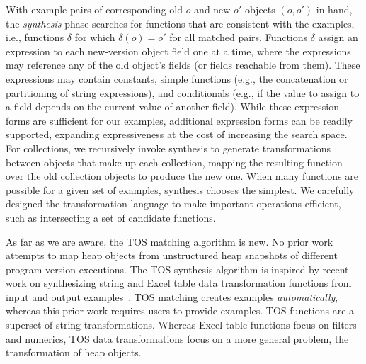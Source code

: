 \documentclass[natbib,10pt]{sigplanconf}
\newcommand{\TOS}{TOS\xspace}
\begin{document}
With example pairs of corresponding old $o$ and new $o'$ objects $(o,o')$ in hand, the
\emph{synthesis} phase searches for functions that are consistent with the
examples, i.e., functions $\delta$ for which $\delta(o) = o'$ for all
matched pairs.  Functions $\delta$ assign an expression to each
new-version object field one at a time, where the expressions may
reference any of the old object's fields (or fields reachable from
them).  These expressions may contain constants, simple functions
(e.g., the concatenation or partitioning of string expressions), and
conditionals (e.g., if the value to assign to a field depends on the
current value of another field). While these expression forms are
sufficient for our examples, additional expression forms can be
readily supported, expanding expressiveness at the cost of increasing the search
space.  For collections, we recursively
invoke synthesis to generate transformations between objects that make
up each collection, mapping the resulting function over the old
collection objects to produce the new one.  
When many functions are possible for a given set of
examples, synthesis chooses the simplest.  We
carefully designed the transformation language to make important
operations efficient, such as  intersecting a set of candidate functions.

As far as we are aware, the \TOS matching algorithm is new. No prior work attempts to 
map heap objects from unstructured heap snapshots of different program-version executions. The  
\TOS synthesis algorithm is inspired by recent work on synthesizing string
and Excel table data transformation functions from input and output
examples~\cite{Gulwani:popl:2011,Gulwani:pldi:2011}.  \TOS matching
creates examples \emph{automatically}, whereas this prior work requires
users to provide examples.  \TOS functions are a superset of string
transformations. Whereas Excel table functions focus on filters and numerics,
 \TOS data transformations focus on a more general problem, the transformation of heap objects.

\end{document}
